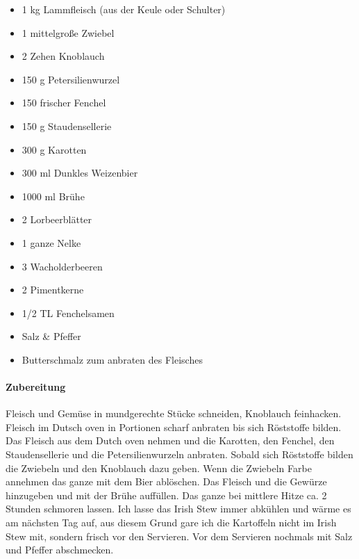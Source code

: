 \begin{itemize}[noitemsep]
	\item 1 kg Lammfleisch (aus der Keule oder Schulter)
	\item 1 mittelgroße Zwiebel
	\item 2 Zehen Knoblauch
	\item 150 g Petersilienwurzel
	\item 150 frischer Fenchel
	\item 150 g Staudensellerie
	\item 300 g Karotten
	\item 300 ml Dunkles Weizenbier
	\item 1000 ml Brühe 
	\item 2 Lorbeerblätter
	\item 1 ganze Nelke
	\item 3 Wacholderbeeren
	\item 2 Pimentkerne
	\item 1/2 TL Fenchelsamen
	\item Salz \& Pfeffer
	\item Butterschmalz zum anbraten des Fleisches
\end{itemize}

\paragraph{Zubereitung}

Fleisch und Gemüse in mundgerechte Stücke schneiden, Knoblauch feinhacken. 
Fleisch im Dutsch oven in Portionen scharf anbraten bis sich Röststoffe bilden. Das Fleisch 
aus dem Dutch oven nehmen und die Karotten, den Fenchel, den Staudensellerie und die 
Petersilienwurzeln anbraten. Sobald sich Röststoffe bilden die Zwiebeln und den Knoblauch 
dazu geben. Wenn die Zwiebeln Farbe annehmen das ganze mit dem Bier ablöschen. Das 
Fleisch und die Gewürze hinzugeben und mit der Brühe auffüllen. Das ganze bei mittlere Hitze 
ca. 2 Stunden
schmoren lassen. Ich lasse das Irish Stew immer abkühlen und wärme es am nächsten Tag auf,
aus diesem Grund gare ich die Kartoffeln nicht im Irish Stew mit, sondern frisch vor den 
Servieren. 
Vor dem Servieren nochmals mit Salz und Pfeffer abschmecken.

